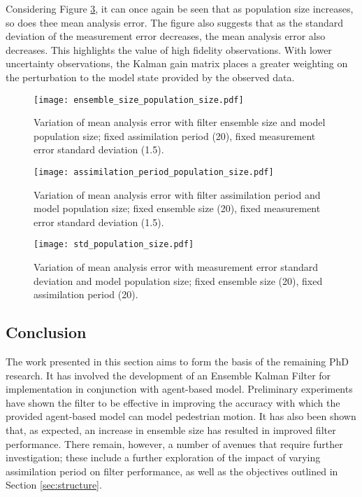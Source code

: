 Considering Figure \ref{fig:std_heatmap}, it can once again be seen that as
population size increases, so does thee mean analysis error.
The figure also suggests that as the standard deviation of the measurement error
decreases, the mean analysis error also decreases.
This highlights the value of high fidelity observations.
With lower uncertainty observations, the Kalman gain matrix places a greater
weighting on the perturbation to the model state provided by the observed data.

\begin{figure}[!hp]
    \centering
    \texttt{[image: ensemble\_size\_population\_size.pdf]}
    \caption{Variation of mean analysis error with filter ensemble size and
        model population size; fixed assimilation period (20), fixed measurement
    error standard deviation (1.5).}\label{fig:es_heatmap}
\end{figure}

\begin{figure}[!hp]
    \centering
    \texttt{[image: assimilation\_period\_population\_size.pdf]}
    \caption{Variation of mean analysis error with filter assimilation period
        and model population size; fixed ensemble size (20), fixed measurement
    error standard deviation (1.5).}\label{fig:ap_heatmap}
\end{figure}

\begin{figure}[!hp]
    \centering
    \texttt{[image: std\_population\_size.pdf]}
    \caption{Variation of mean analysis error with measurement error standard
        deviation and model population size; fixed ensemble size (20), fixed
    assimilation period (20).}\label{fig:std_heatmap}
\end{figure}

\subsection{Conclusion}\label{sub:research:conclusion}

The work presented in this section aims to form the basis of the remaining PhD
research.
It has involved the development of an Ensemble Kalman Filter for implementation
in conjunction with agent-based model.
Preliminary experiments have shown the filter to be effective in improving the
accuracy with which the provided agent-based model can model pedestrian motion.
It has also been shown that, as expected, an increase in ensemble size has
resulted in improved filter performance.
There remain, however, a number of avenues that require further investigation;
these include a further exploration of the impact of varying assimilation period
on filter performance, as well as the objectives outlined in Section
\ref{sec:structure}.


